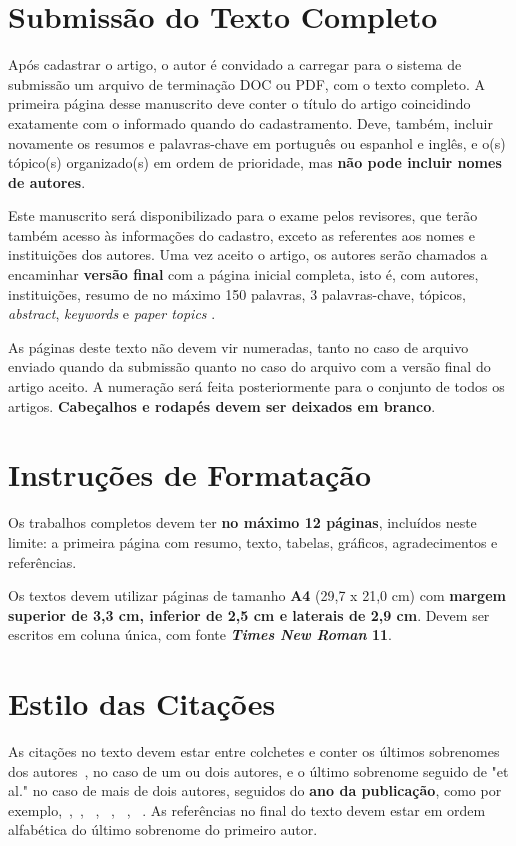 \documentclass[a4paper,11pt]{article}
\begin{document}
\section{Submiss\~ao do Texto Completo}

Ap\'os cadastrar o artigo, o autor \'e convidado a carregar para o sistema de submiss\~ao um arquivo 
de termina\-\c c\~ao DOC ou PDF, com o texto completo. 
A primeira p\'agina desse manuscrito deve conter o t\'itulo do artigo coincidindo exatamente com o informado quando do cadastramento. 
Deve, tamb\'em, incluir novamente os resumos e palavras-chave em portugu\^es ou espanhol e ingl\^es, e o(s) t\'opico(s) organizado(s) 
em ordem de prioridade, mas \textbf{n\~ao pode incluir nomes de autores}.

Este manuscrito ser\'a disponibilizado para o exame pelos revisores, que ter\~ao tamb\'em acesso
 \`as informa\c c\~oes do cadastro, exceto as referentes aos nomes e institui\c c\~oes dos autores. 
Uma vez aceito o artigo, os autores ser\~ao chamados a encaminhar \textbf{vers\~ao final} com a p\'agina inicial completa, isto \'e, com autores, institui\c c\~oes, resumo de no m\'aximo 150 palavras, 3 palavras-chave, t\'opicos, \textit{abstract}, \textit{keywords} e \textit{paper topics} .

As p\'aginas deste texto n\~ao devem vir numeradas, tanto no caso de arquivo enviado quando da submiss\~ao quanto no caso do arquivo com a vers\~ao final do artigo aceito. 
A numera\c c\~ao ser\'a feita posteriormente para o conjunto de todos os artigos.
\textbf{Cabe\c calhos e rodap\'es devem ser deixados em branco}.


\section{ Instru\c c\~oes de Formata\c c\~ao}


Os trabalhos completos devem ter \textbf{no m\'aximo 12 p\'aginas}, inclu\'idos neste limite: a primeira p\'agina com resumo, texto, tabelas, gr\'aficos, agradecimentos e refer\^encias.

Os textos devem utilizar p\'aginas de tamanho \textbf{A4} (29,7 x 21,0 cm) com \textbf{margem superior de 3,3 cm, inferior de 2,5 cm e laterais de 2,9 cm}.
 Devem ser escritos em coluna \'unica, com fonte \textbf{\textit{Times New Roman} 11}. 



\section{ Estilo das Cita\c c\~oes}


As cita\c c\~oes no texto devem estar entre colchetes e conter  os \'ultimos sobrenomes dos autores~\citep{silva:99}, no caso de um ou dois autores, e o \'ultimo sobrenome seguido de "et al." no caso de mais de dois autores, seguidos do \textbf{ano da publica\c c\~ao}, como por exemplo,~\citep{anna:06},~\citep{gates:03}, ~\citep{smith:02}, ~\citep{silva:99}, ~\citep{pele:04}, ~\citep{web:16}.
As refer\^encias no final do texto devem estar em ordem alfab\'etica do \'ultimo sobrenome do primeiro autor. 


~\\


\end{document}
